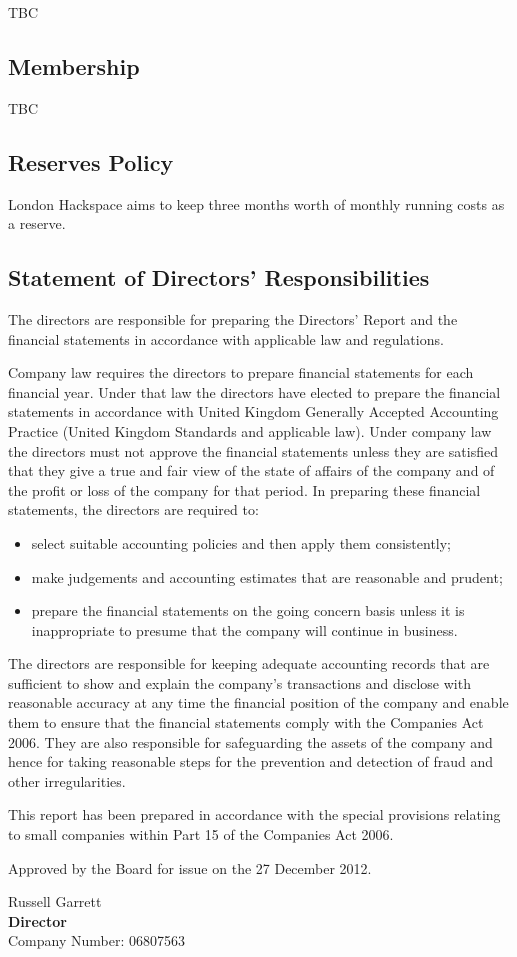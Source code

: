 TBC

\subsection{Membership}

TBC

\subsection{Reserves Policy}

London Hackspace aims to keep three months worth of monthly running costs as a reserve.

\subsection{Statement of Directors' Responsibilities}
The directors are responsible for preparing the Directors' Report and the financial statements in accordance with applicable law and regulations.

Company law requires the directors to prepare financial statements for each financial year. Under that law the directors have elected to prepare the financial statements in accordance with United Kingdom Generally Accepted Accounting Practice (United Kingdom Standards and applicable law). Under company law the directors must not approve the financial statements unless they are satisfied that they give a true and fair view of the state of affairs of the company and of the profit or loss of the company for that period. In preparing these financial statements, the directors are required to:

\begin{itemize}
    \item select suitable accounting policies and then apply them consistently;
    \item make judgements and accounting estimates that are reasonable and prudent;
    \item prepare the financial statements on the going concern basis unless it is inappropriate to presume that the company will continue in business.
\end{itemize}

The directors are responsible for keeping adequate accounting records that are sufficient to show and explain the company's transactions and disclose with reasonable accuracy at any time the financial position of the company and enable them to ensure that the financial statements comply with the Companies Act 2006. They are also responsible for safeguarding the assets of the company and hence for taking reasonable steps for the prevention and detection of fraud and other irregularities.

This report has been prepared in accordance with the special provisions relating to small companies within Part 15 of the Companies Act 2006.

Approved by the Board for issue on the 27 December 2012.
\vspace{48pt}

Russell Garrett \\
{\bf Director} \\
Company Number: 06807563
